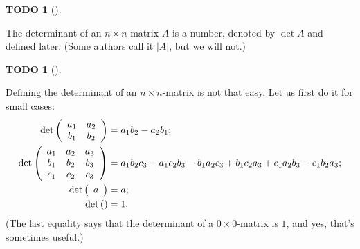 \documentclass[numbers=enddot,12pt,final,onecolumn,notitlepage]{scrartcl}%
\theoremstyle{definition}
\newtheorem{quest}[theo]{TODO}
\newenvironment{todo}[1][]
{\begin{quest}[#1]\begin{leftbar}}
{\end{leftbar}\end{quest}}
\begin{document}
\begin{todo}
The determinant of an $n\times n$-matrix $A$ is a number, denoted by $\det A$
and defined later. (Some authors call it $\left\vert A\right\vert $, but we
will not.)
\end{todo}

\begin{todo}
Defining the determinant of an $n\times n$-matrix is not that easy. Let us
first do it for small cases:%
\begin{align*}
\det\left(
\begin{array}
[c]{cc}%
a_{1} & a_{2}\\
b_{1} & b_{2}%
\end{array}
\right)   &  =a_{1}b_{2}-a_{2}b_{1};\\
\det\left(
\begin{array}
[c]{ccc}%
a_{1} & a_{2} & a_{3}\\
b_{1} & b_{2} & b_{3}\\
c_{1} & c_{2} & c_{3}%
\end{array}
\right)   &  =a_{1}b_{2}c_{3}-a_{1}c_{2}b_{3}-b_{1}a_{2}c_{3}+b_{1}c_{2}%
a_{3}+c_{1}a_{2}b_{3}-c_{1}b_{2}a_{3};\\
\det\left(
\begin{array}
[c]{c}%
a
\end{array}
\right)   &  =a;\\
\det\left(  {}\right)   &  =1.
\end{align*}
(The last equality says that the determinant of a $0\times0$-matrix is $1$,
and yes, that's sometimes useful.)
\end{todo}
\end{document}
